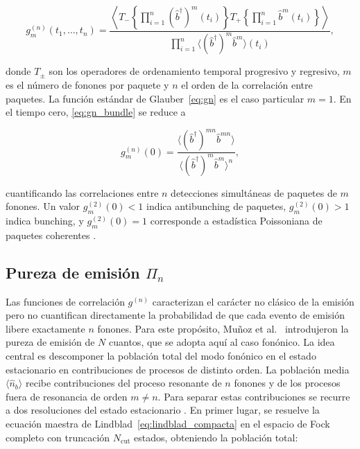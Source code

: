 \begin{equation}
	g_m^{(n)}(t_1,\ldots,t_n) =
	\frac{\left\langle T_-\!\left\{\prod_{i=1}^n
		(\hat{b}^\dagger)^m(t_i)\right\}
		T_+\!\left\{\prod_{i=1}^n \hat{b}^m(t_i)\right\}\right\rangle}
	{\prod_{i=1}^n \langle(\hat{b}^\dagger)^m\hat{b}^m\rangle(t_i)},
	\label{eq:gn_bundle}
\end{equation}

donde $T_\pm$ son los operadores de ordenamiento temporal progresivo y regresivo, $m$ es el número de fonones por paquete y $n$ el orden de la correlación entre paquetes. La función estándar de Glauber~\eqref{eq:gn} es el caso particular $m=1$. En el tiempo cero, \eqref{eq:gn_bundle} se reduce a

\begin{equation}
	g_m^{(n)}(0) =
	\frac{\langle(\hat{b}^\dagger)^{mn}\hat{b}^{mn}\rangle}
	{\langle(\hat{b}^\dagger)^m\hat{b}^m\rangle^n},
	\label{eq:gn_bundle_zero}
\end{equation}

cuantificando las correlaciones entre $n$ detecciones simultáneas de paquetes de $m$ fonones. Un valor $g_m^{(2)}(0) < 1$ indica antibunching de paquetes, $g_m^{(2)}(0) > 1$ indica bunching, y $g_m^{(2)}(0) = 1$ corresponde a estadística Poissoniana de paquetes coherentes \cite{bin2020}.

\subsection{Pureza de emisión $\Pi_n$}
\label{sec:pureza}

Las funciones de correlación $g^{(n)}$ caracterizan el carácter no clásico de la emisión pero no cuantifican directamente la probabilidad de que cada evento de emisión libere exactamente $n$ fonones. Para este propósito, Muñoz et al.\ \cite{munoz2014,munoz2018} introdujeron la pureza de emisión de $N$ cuantos, que se adopta aquí al caso fonónico. La idea central es descomponer la población total del modo fonónico en el estado estacionario en contribuciones de procesos de distinto orden. La población media $\langle\hat{n}_b\rangle$ recibe contribuciones del proceso resonante de $n$ fonones y de los procesos fuera de resonancia de orden $m \neq n$. Para separar estas contribuciones se recurre a dos resoluciones del estado estacionario \cite{munoz2018}. En primer lugar, se resuelve la ecuación maestra de Lindblad~\eqref{eq:lindblad_compacta} en el espacio de Fock completo con truncación $N_\text{cut}$ estados, obteniendo la población total:

